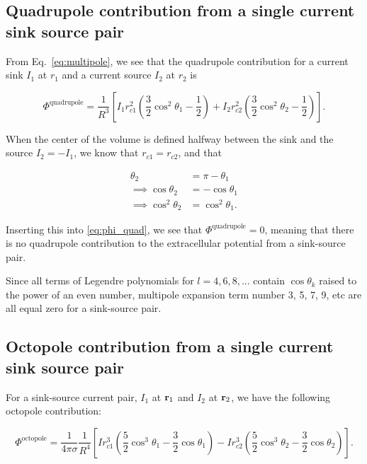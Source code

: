 \subsection{Quadrupole contribution from a single current sink source pair}\label{subsec:quad}

From Eq.~\ref{eq:multipole}, we see that the quadrupole contribution for a current sink $I_1$ at $r_1$ and a current source $I_2$ at $r_2$ is

\begin{equation}\label{eq:phi_quad}
\Phi^{\mathrm{quadrupole}} = \frac{1}{R^3} \left[ I_1 r_{c1}^2 \left( \frac{3}{2} \cos^2 \theta_1 - \frac{1}{2} \right) + I_2 r_{c2}^2 \left( \frac{3}{2} \cos^2 \theta_2 - \frac{1}{2} \right) \right].
\end{equation}

When the center of the volume is defined halfway between the sink and the source $I_2 = -I_1$, we know that $r_{c1} = r_{c2}$, and that

\begin{align*}
\theta_2 &= \pi - \theta_1 \\
\implies \cos \theta_2 &= -\cos \theta_1 \\
\implies \cos^2 \theta_2 &= \cos^2 \theta_1.
\end{align*}

Inserting this into \eqref{eq:phi_quad}, we see that $\Phi^{\mathrm{quadrupole}} = 0$, meaning that there is no quadrupole contribution to the extracellular potential from a sink-source pair.

Since all terms of Legendre polynomials for $l = 4, 6, 8, ...$ contain $\cos \theta_k$ raised to the power of an even number, multipole expansion term number 3, 5, 7, 9, etc are all equal zero for a sink-source pair.

\subsection{Octopole contribution from a single current sink source pair}\label{subsec:octo}

For a sink-source current pair, $I_1$ at ${\bf r}_1$ and $I_2$ at ${\bf r}_2$, we have the following octopole contribution:

\begin{equation*}
\Phi^{\mathrm{octopole}} = \frac{1}{4 \pi \sigma} \frac{1}{R^4}\left[ 
I r_{c1}^3 \left( \frac{5}{2} \cos^3 \theta_1 - 
\frac{3}{2}\cos \theta_1 \right) - 
I r_{c2}^3 \left( \frac{5}{2} \cos^3 \theta_2
 - \frac{3}{2} \cos \theta_2 \right)
\right].
\end{equation*}

